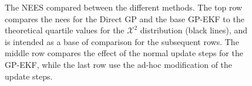 \begin{figure}
    \caption{The NEES compared between the different methods. The top row compares the \acrshort{nees} for the Direct GP and the base GP-EKF to the theoretical quartile values for the $\mathcal{X}^2$ distribution (black lines), and is intended as a base of comparison for the subsequent rows. The middle row compares the effect of the normal update steps for the GP-EKF, while the last row use the ad-hoc modification of the update steps. }

\end{figure}

